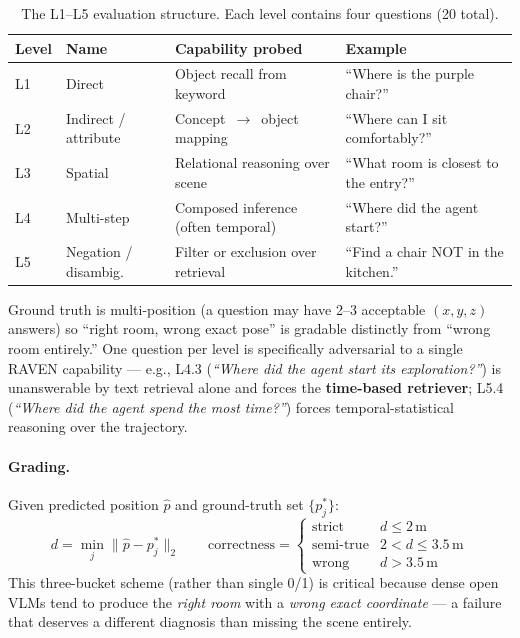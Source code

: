 \documentclass[11pt]{article}
\begin{document}
\begin{table}[h]
\centering
\small
\caption{The L1--L5 evaluation structure. Each level contains four questions (20 total).}
\label{tab:levels}
\begin{tabularx}{\textwidth}{llXl}
\toprule
\textbf{Level} & \textbf{Name} & \textbf{Capability probed} & \textbf{Example} \\
\midrule
L1 & Direct                  & Object recall from keyword                    & ``Where is the purple chair?'' \\
L2 & Indirect / attribute    & Concept~$\rightarrow$~object mapping          & ``Where can I sit comfortably?'' \\
L3 & Spatial                 & Relational reasoning over scene               & ``What room is closest to the entry?'' \\
L4 & Multi-step              & Composed inference (often temporal)           & ``Where did the agent start?'' \\
L5 & Negation / disambig.    & Filter or exclusion over retrieval            & ``Find a chair NOT in the kitchen.'' \\
\bottomrule
\end{tabularx}
\end{table}

Ground truth is multi-position (a question may have 2--3 acceptable $(x, y, z)$ answers) so ``right room, wrong exact pose'' is gradable distinctly from ``wrong room entirely.'' One question per level is specifically adversarial to a single RAVEN capability --- e.g., L4.3 (\emph{``Where did the agent start its exploration?''}) is unanswerable by text retrieval alone and forces the \textbf{time-based retriever}; L5.4 (\emph{``Where did the agent spend the most time?''}) forces temporal-statistical reasoning over the trajectory.

\paragraph{Grading.} Given predicted position $\hat{p}$ and ground-truth set $\{p^*_j\}$:
\begin{equation}
d = \min_j \|\hat{p} - p^*_j\|_2 \qquad
\text{correctness} = \begin{cases}
\text{strict}     & d \leq 2\,\text{m} \\
\text{semi-true}  & 2 < d \leq 3.5\,\text{m} \\
\text{wrong}      & d > 3.5\,\text{m}
\end{cases}
\end{equation}
This three-bucket scheme (rather than single 0/1) is critical because dense open VLMs tend to produce the \emph{right room} with a \emph{wrong exact coordinate} --- a failure that deserves a different diagnosis than missing the scene entirely.
\end{document}
